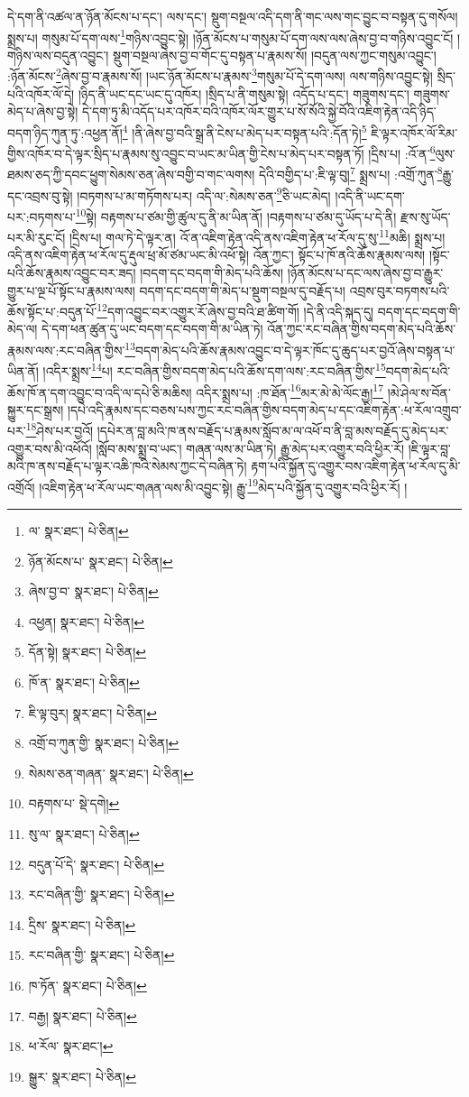 དེ་དག་ནི་འཚལ་ན་ཉོན་མོངས་པ་དང་། ལས་དང་། སྡུག་བསྔལ་འདི་དག་ནི་གང་ལས་གང་བྱུང་བ་བསྟན་དུ་གསོལ། སྨྲས་པ། གསུམ་པོ་དག་ལས་\footnote{ལ་  སྣར་ཐང་།  པེ་ཅིན། }གཉིས་འབྱུང་སྟེ། །ཉོན་མོངས་པ་གསུམ་པོ་དག་ལས་ལས་ཞེས་བྱ་བ་གཉིས་འབྱུང་ངོ། །གཉིས་ལས་བདུན་འབྱུང་། སྡུག་བསྔལ་ཞེས་བྱ་བ་གོང་དུ་བསྟན་པ་རྣམས་སོ། །བདུན་ལས་ཀྱང་གསུམ་འབྱུང་། :ཉོན་མོངས་\footnote{ཉོན་མོངས་པ་  སྣར་ཐང་།  པེ་ཅིན། }ཞེས་བྱ་བ་རྣམས་སོ། །ཡང་ཉོན་མོངས་པ་རྣམས་\footnote{ཞེས་བྱ་བ་  སྣར་ཐང་།  པེ་ཅིན། }གསུམ་པོ་དེ་དག་ལས། ལས་གཉིས་འབྱུང་སྟེ། སྲིད་པའི་འཁོར་ལོ་དེ། །ཉིད་ནི་ཡང་དང་ཡང་དུ་འཁོར། །སྲིད་པ་ནི་གསུམ་སྟེ། འདོད་པ་དང་། གཟུགས་དང་། གཟུགས་མེད་པ་ཞེས་བྱ་སྟེ། དེ་དག་ཏུ་མི་འདོད་པར་འཁོར་བའི་འཁོར་ལོར་གྱུར་པ་སོ་སོའི་སྐྱེ་བོའི་འཇིག་རྟེན་འདི་ཉིད་བདག་ཉིད་ཀུན་ཏུ་:འཕྱན་ནོ།\footnote{འཕྱན།  སྣར་ཐང་།  པེ་ཅིན། } །ནི་ཞེས་བྱ་བའི་སྒྲ་ནི་ངེས་པ་མེད་པར་བསྟན་པའི་:དོན་ཏེ།\footnote{དོན་སྟེ།  སྣར་ཐང་།  པེ་ཅིན། } ཇི་ལྟར་འཁོར་ལོ་རིམ་གྱིས་འཁོར་བ་དེ་ལྟར་སྲིད་པ་རྣམས་སུ་འབྱུང་བ་ཡང་མ་ཡིན་གྱི་ངེས་པ་མེད་པར་བསྟན་ཏོ། །དྲིས་པ། :འོ་ན་\footnote{ཁོ་ན་  སྣར་ཐང་།  པེ་ཅིན། }ལུས་ཐམས་ཅད་ཀྱི་དབང་ཕྱུག་སེམས་ཅན་ཞེས་བགྱི་བ་གང་ལགས། དེའི་བགྱིད་པ་:ཇི་ལྟ་བུ།\footnote{ཇི་ལྟ་བུར།  སྣར་ཐང་།  པེ་ཅིན། } སྨྲས་པ། :འགྲོ་ཀུན་\footnote{འགྲོ་བ་ཀུན་གྱི་  སྣར་ཐང་།  པེ་ཅིན། }རྒྱུ་དང་འབྲས་བུ་སྟེ། །བཏགས་པ་མ་གཏོགས་པར། འདི་ལ་:སེམས་ཅན་\footnote{སེམས་ཅན་གཞན་  སྣར་ཐང་།  པེ་ཅིན། }ཅི་ཡང་མེད། །འདི་ནི་ཡང་དག་པར་:བཏགས་པ་\footnote{བརྟགས་པ་  སྡེ་དགེ། }སྟེ། བརྟགས་པ་ཙམ་གྱི་ཚུལ་དུ་ནི་མ་ཡིན་ནོ། །བརྟགས་པ་ཙམ་དུ་ཡོད་པ་དེ་ནི། རྫས་སུ་ཡོད་པར་མི་རུང་ངོ། །དྲིས་པ། གལ་ཏེ་དེ་ལྟར་ན། འོ་ན་འཇིག་རྟེན་འདི་ནས་འཇིག་རྟེན་ཕ་རོལ་དུ་སུ་\footnote{སུ་ལ་  སྣར་ཐང་།  པེ་ཅིན། }མཆི། སྨྲས་པ། འདི་ནས་འཇིག་རྟེན་ཕ་རོལ་དུ་རྡུལ་ཕྲ་མོ་ཙམ་ཡང་མི་འཕོ་སྟེ། འོན་ཀྱང་། སྟོང་པ་ཁོ་ནའི་ཆོས་རྣམས་ལས། །སྟོང་པའི་ཆོས་རྣམས་འབྱུང་བར་ཟད། །བདག་དང་བདག་གི་མེད་པའི་ཆོས། །ཉོན་མོངས་པ་དང་ལས་ཞེས་བྱ་བ་རྒྱུར་གྱུར་པ་ལྔ་པོ་སྟོང་པ་རྣམས་ལས། བདག་དང་བདག་གི་མེད་པ་སྡུག་བསྔལ་དུ་བརྗོད་པ། འབྲས་བུར་བཏགས་པའི་ཆོས་སྟོང་པ་:བདུན་པོ་\footnote{བདུན་པོ་དེ་  སྣར་ཐང་།  པེ་ཅིན། }དག་འབྱུང་བར་འགྱུར་རོ་ཞེས་བྱ་བའི་ཐ་ཚིག་གོ། །དེ་ནི་འདི་སྐད་དུ། བདག་དང་བདག་གི་མེད་ལ། དེ་དག་ཕན་ཚུན་དུ་ཡང་བདག་དང་བདག་གི་མ་ཡིན་ཏེ། འོན་ཀྱང་རང་བཞིན་གྱིས་བདག་མེད་པའི་ཆོས་རྣམས་ལས་:རང་བཞིན་གྱིས་\footnote{རང་བཞིན་གྱི་  སྣར་ཐང་།  པེ་ཅིན། }བདག་མེད་པའི་ཆོས་རྣམས་འབྱུང་བ་དེ་ལྟར་ཁོང་དུ་ཆུད་པར་བྱའོ་ཞེས་བསྟན་པ་ཡིན་ནོ། །འདིར་སྨྲས་\footnote{དྲིས་  སྣར་ཐང་།  པེ་ཅིན། }པ། རང་བཞིན་གྱིས་བདག་མེད་པའི་ཆོས་དག་ལས་:རང་བཞིན་གྱིས་\footnote{རང་བཞིན་གྱི་  སྣར་ཐང་།  པེ་ཅིན། }བདག་མེད་པའི་ཆོས་ཁོ་ན་དག་འབྱུང་བ་འདི་ལ་དཔེ་ཅི་མཆིས། འདིར་སྨྲས་པ། :ཁ་ཐོན་\footnote{ཁ་ཏོན་  སྣར་ཐང་།  པེ་ཅིན། }མར་མེ་མེ་ལོང་རྒྱ།\footnote{བརྒྱ།  སྣར་ཐང་།  པེ་ཅིན། } །མེ་ཤེལ་ས་བོན་སྐྱུར་དང་སྒྲས། །དཔེ་འདི་རྣམས་དང་བཅས་པས་ཀྱང་རང་བཞིན་གྱིས་བདག་མེད་པ་དང་འཇིག་རྟེན་:ཕ་རོལ་འགྲུབ་པར་\footnote{ཕ་རོལ་  སྣར་ཐང་། }ཤེས་པར་བྱའོ། །དཔེར་ན་བླ་མའི་ཁ་ནས་བརྗོད་པ་རྣམས་སློབ་མ་ལ་འཕོ་བ་ནི་བླ་མས་བརྗོད་དུ་མེད་པར་འགྱུར་བས་མི་འཕོའོ། །སློབ་མས་སྨྲ་བ་ཡང་། གཞན་ལས་མ་ཡིན་ཏེ། རྒྱུ་མེད་པར་འགྱུར་བའི་ཕྱིར་རོ། །ཇི་ལྟར་བླ་མའི་ཁ་ནས་བརྗོད་པ་ལྟར་འཆི་ཁའི་སེམས་ཀྱང་དེ་བཞིན་ཏེ། རྟག་པའི་སྐྱོན་དུ་འགྱུར་བས་འཇིག་རྟེན་ཕ་རོལ་དུ་མི་འགྲོའོ། །འཇིག་རྟེན་ཕ་རོལ་ཡང་གཞན་ལས་མི་འབྱུང་སྟེ། རྒྱུ་\footnote{སྒྱུར་  སྣར་ཐང་།  པེ་ཅིན། }མེད་པའི་སྐྱོན་དུ་འགྱུར་བའི་ཕྱིར་རོ། །
